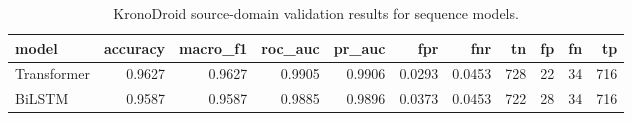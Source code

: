 \begin{table}
\caption{KronoDroid source-domain validation results for sequence models.}
\label{tab:source_sequence_validation}
\begin{tabular}{lrrrrrrrrrr}
\toprule
model & accuracy & macro_f1 & roc_auc & pr_auc & fpr & fnr & tn & fp & fn & tp \\
\midrule
Transformer & 0.9627 & 0.9627 & 0.9905 & 0.9906 & 0.0293 & 0.0453 & 728 & 22 & 34 & 716 \\
BiLSTM & 0.9587 & 0.9587 & 0.9885 & 0.9896 & 0.0373 & 0.0453 & 722 & 28 & 34 & 716 \\
\bottomrule
\end{tabular}
\end{table}
